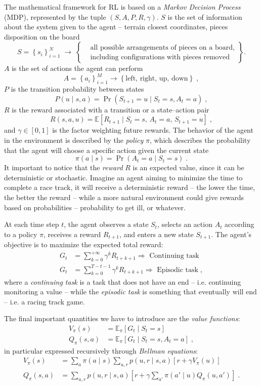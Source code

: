 \documentclass[12pt,a4paper]{article}
\begin{document}
The mathematical framework for RL is based on a \textit{Markov Decision Process} (MDP), represented by the tuple $(S,A,P,R,\gamma)$. $S$ is the set of information about the system given to the agent -- terrain closest coordinates, pieces disposition on the board
\[
S = \left\{s_i\right\}_{i=1}^{N}
\;\longrightarrow\;
\left\{
\begin{aligned}
	&\text{all possible arrangements of pieces on a board,}\\
	&\text{including configurations with pieces removed}
\end{aligned}
\right\}.
\]
$A$ is the set of actions the agent can perform
$$
A = \left\{a_i\right\}_{i=1}^M \rightarrow \left\{\text{left, right, up, down}\right\} \;,
$$
$P$ is the transition probability between states
$$
P(u \mid s,a) = \Pr(S_{t+1}=u \mid S_t=s, A_t=a) \;,
$$
$R$ is the reward associated with a transition or a state--action pair
$$
R(s,a,u) = \mathbb{E}\left[R_{t+1}\mid S_t=s,\, A_t=a,\, S_{t+1}=u\right] \;,
$$
and $\gamma \in [0,1]$ is the factor weighting future rewards. The behavior of the agent in the environment is described by the \textit{policy} $\pi$, which describes the probability that the agent will choose a specific action given the current state
$$
\pi(a \mid s) = \Pr(A_t=a \mid S_t=s) \;.
$$
It important to notice that the \textit{reward} $R$ is an expected value, since it can be deterministic or stochastic. Imagine an agent aiming to minimize the time to complete a race track, it will receive a deterministic reward -- the lower the time, the better the reward -- while a more natural environment could give rewards based on probabilities -- probability to get ill, or whatever.

At each time step $t$, the agent observes a state $S_t$, selects an action $A_t$ according to a policy $\pi$, receives a reward $R_{t+1}$, and enters a new state $S_{t+1}$. The agent's objective is to maximize the expected total reward:
\begin{align*}
	G_t &= \sum_{k=0}^{+\infty} \gamma^k R_{t+k+1} \Rightarrow \text{ Continuing task} \\[8pt]
	G_t &= \sum_{k=0}^{T-t-1} \gamma^k R_{t+k+1} \Rightarrow \text{ Episodic task} \;,
\end{align*}
where a \textit{continuing task} is a task that does not have an end -- i.e. continuing monitoring a value -- while the \textit{episodic task} is something that eventually will end -- i.e. a racing track game.

The final important quantities we have to introduce are the \textit{value functions}:
\begin{align*}
	V_\pi(s) &= \mathbb{E}_\pi \left[ G_t \mid S_t = s \right] \\[8pt]
	Q_\pi(s,a) &= \mathbb{E}_\pi \left[ G_t \mid S_t = s, A_t = a \right] \;,
\end{align*}
in particular expressed recursively through \textit{Bellman equations}:
\begin{align*}
	V_\pi(s) &= \sum_a \pi(a\mid s)\sum_{u,r}p(u,r\mid s,a)\left[r+\gamma V_\pi(u)\right] \\[8pt]
	Q_\pi(s,a) &= \sum_{u,r}p(u,r \mid s,a)\left[ r + \gamma \sum_{a'}\pi(a' \mid u) Q_\pi(u,a')\right] \;.
\end{align*}
\end{document}
